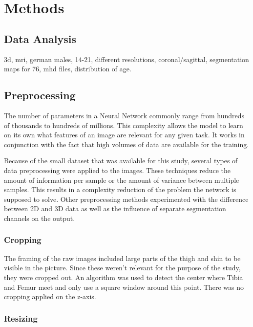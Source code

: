 \section{Methods}

\subsection{Data Analysis}

3d, mri, german males, 14-21, different resolutions, coronal/sagittal, segmentation maps for 76, mhd files, distribution of age.



\subsection{Preprocessing}

The number of parameters in a Neural Network commonly range from hundreds of thousands to hundreds of millions. This complexity allows the model to learn on its own what features of an image are relevant for any given task. It works in conjunction with the fact that high volumes of data are available for the training.

Because of the small dataset that was available for this study, several types of data preprocessing were applied to the images. These techniques reduce the amount of information per sample or the amount of variance between multiple samples. This results in a complexity reduction of the problem the network is supposed to solve. Other preprocessing methods experimented with the difference between 2D and 3D data as well as the influence of separate segmentation channels on the output.

\subsubsection{Cropping}

The framing of the raw images included large parts of the thigh and shin to be visible in the picture. Since these weren't relevant for the purpose of the study, they were cropped out. An algorithm was used to detect the center where Tibia and Femur meet and only use a square window around this point. There was no cropping applied on the z-axis.

\subsubsection{Resizing}

